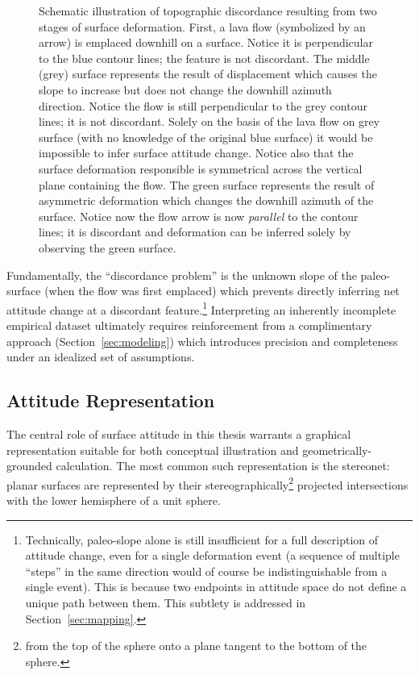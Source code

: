 \begin{figure}
    \caption[Discordance \& attitude change]{Schematic illustration of topographic discordance resulting from two stages of surface deformation. First, a lava flow (symbolized by an arrow) is emplaced downhill on a surface. Notice it is perpendicular to the blue contour lines; the feature is not discordant. The middle (grey) surface represents the result of displacement which causes the slope to increase but does not change the downhill azimuth direction. Notice the flow is still perpendicular to the grey contour lines; it is not discordant. Solely on the basis of the lava flow on grey surface (with no knowledge of the original blue surface) it would be impossible to infer surface attitude change. Notice also that the surface deformation responsible is symmetrical across the vertical plane containing the flow. The green surface represents the result of asymmetric deformation which changes the downhill azimuth of the surface. Notice now the flow arrow is now \emph{parallel} to the contour lines; it is discordant and deformation can be inferred solely by observing the green surface.}%
    \label{fig:discordance-concept}
\end{figure}

Fundamentally, the ``discordance problem'' is the unknown slope of the paleo-surface (when the flow was first emplaced) which prevents directly inferring net attitude change at a discordant feature.\footnote{Technically, paleo-slope alone is still insufficient for a full description of attitude change, even for a single deformation event (a sequence of multiple ``steps'' in the same direction would of course be indistinguishable from a single event). This is because two endpoints in attitude space do not define a unique path between them. This subtlety is addressed in Section~\ref{sec:mapping}.} Interpreting an inherently incomplete empirical dataset ultimately requires reinforcement from a complimentary approach (Section~\ref{sec:modeling}) which introduces precision and completeness under an idealized set of assumptions.

\subsection{Attitude Representation}\label{sec:attitude-representation}

The central role of surface attitude in this thesis warrants a graphical representation suitable for both conceptual illustration and geometrically-grounded calculation. The most common such representation is the stereonet: planar surfaces are represented by their stereographically\footnote{from the top of the sphere onto a plane tangent to the bottom of the sphere.} projected intersections with the lower hemisphere of a unit sphere.

